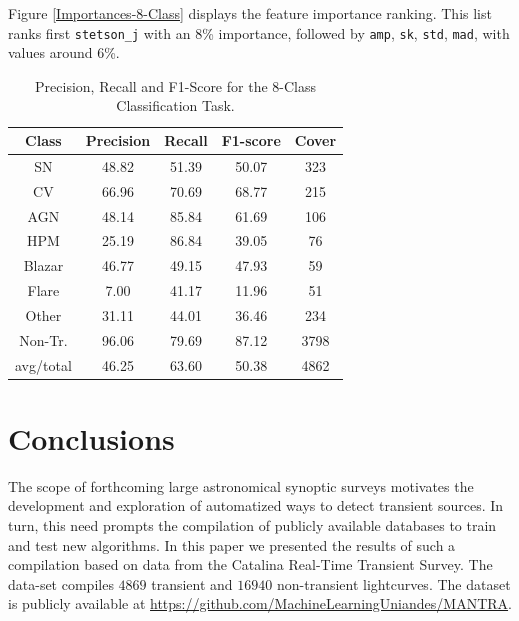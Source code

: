 \documentclass[twocolumn]{aastex62}
\begin{document}
Figure \ref{Importances-8-Class} displays the feature importance ranking.
This list ranks first \texttt{stetson\_j} with an 8\% importance,
followed by \texttt{amp}, \texttt{sk}, \texttt{std}, \texttt{mad},
with values around 6\%.   

\begin{table}
\centering
\begin{tabular}{ccccc}
\hline
\textbf{Class} & \textbf{Precision} & \textbf{Recall} & \textbf{F1-score}& \textbf{Cover} \\\hline \hline
SN             & 48.82	& 51.39 &	50.07	 & 323 \\\hline
CV             & 66.96	& 70.69 &	68.77	 & 215 \\\hline
AGN            & 48.14	& 85.84 &	61.69	 & 106 \\\hline
HPM            & 25.19	& 86.84 &	39.05	 & 76 \\\hline
Blazar         & 46.77	& 49.15 &	47.93	 & 59 \\\hline
Flare          & 7.00	& 41.17 &	11.96	 & 51 \\\hline
Other          & 31.11	& 44.01 &	36.46	 & 234 \\\hline
Non-Tr.        & 96.06	& 79.69 &	87.12	 & 3798 \\\hline
avg/total      & 46.25	& 63.60 &	50.38	 & 4862 \\\hline
\end{tabular}%
\caption{Precision, Recall and F1-Score for the 8-Class Classification Task.}
\label{Overall-Scores-8-Class-Regular}
\end{table}



\section{Conclusions}
\label{sec:conclusions}

The scope of forthcoming large astronomical synoptic surveys 
motivates the development and exploration of automatized ways to
detect transient sources. 
In turn, this need prompts the compilation of publicly available databases
to train and test new algorithms. 
In this paper we presented the results of such a compilation based on data
from the Catalina Real-Time Transient Survey.
The data-set compiles  $4869$ transient and $16940$ non-transient
lightcurves. 
The dataset is publicly available at
\url{https://github.com/MachineLearningUniandes/MANTRA}.   
\end{document}
